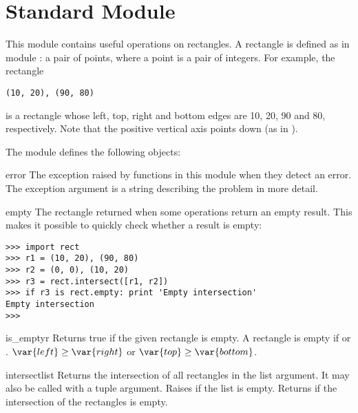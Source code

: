 \section{Standard Module }

This module contains useful operations on rectangles.
A rectangle is defined as in module
:
a pair of points, where a point is a pair of integers.
For example, the rectangle

\bcode\begin{verbatim}
(10, 20), (90, 80)
\end{verbatim}\ecode

is a rectangle whose left, top, right and bottom edges are 10, 20, 90
and 80, respectively.
Note that the positive vertical axis points down (as in
).

The module defines the following objects:

\renewcommand{\indexsubitem}{(in module rect)}
\begin{excdesc}{error}
The exception raised by functions in this module when they detect an
error.
The exception argument is a string describing the problem in more
detail.
\end{excdesc}

\begin{datadesc}{empty}
The rectangle returned when some operations return an empty result.
This makes it possible to quickly check whether a result is empty:

\bcode\begin{verbatim}
>>> import rect
>>> r1 = (10, 20), (90, 80)
>>> r2 = (0, 0), (10, 20)
>>> r3 = rect.intersect([r1, r2])
>>> if r3 is rect.empty: print 'Empty intersection'
Empty intersection
>>> 
\end{verbatim}\ecode
\end{datadesc}

\begin{funcdesc}{is_empty}{r}
Returns true if the given rectangle is empty.
A rectangle
is empty if
\iftexi
{} or .
\else
$\var{left} \geq \var{right}$ or $\var{top} \geq \var{bottom}$.
\fi
\end{funcdesc}

\begin{funcdesc}{intersect}{list}
Returns the intersection of all rectangles in the list argument.
It may also be called with a tuple argument.
Raises
if the list is empty.
Returns
if the intersection of the rectangles is empty.
\end{funcdesc}

